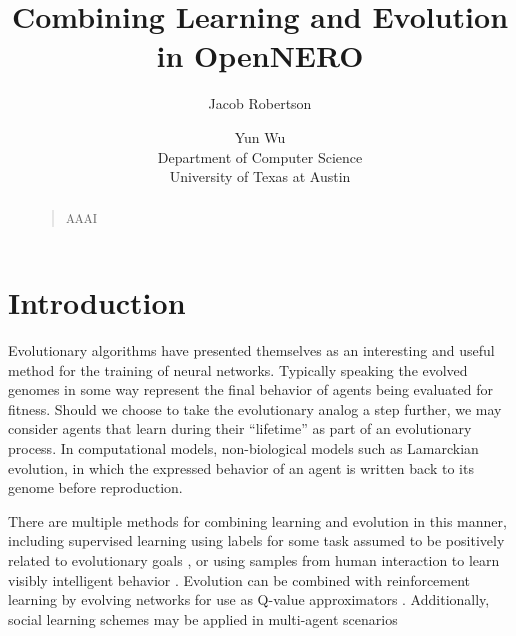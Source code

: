 \documentclass[letterpaper]{article}
\begin{document}
%
\title{Combining Learning and Evolution in OpenNERO}
\author{Jacob Robertson \and Yun Wu\\
Department of Computer Science\\
University of Texas at Austin\\
}
\maketitle
\begin{abstract}
\begin{quote}
AAAI
\end{quote}
\end{abstract}

\section{Introduction}
Evolutionary algorithms have presented themselves as an interesting and useful method for the training of neural networks. Typically speaking the evolved genomes in some way represent the final behavior of agents being evaluated for fitness. Should we choose to take the evolutionary analog a step further, we may consider agents that learn during their ``lifetime'' as part of an evolutionary process.  In computational models, non-biological models such as Lamarckian evolution, in which the expressed behavior of an agent is written back to its genome before reproduction.

There are multiple methods for combining learning and evolution in this manner, including supervised learning using labels for some task assumed to be positively related to evolutionary goals \cite{nolfi1994learning}, or using samples from human interaction to learn visibly intelligent behavior \cite{bryant2007acquiring}. Evolution can be combined with reinforcement learning by evolving networks for use as Q-value approximators \cite{whiteson2006evolutionary}. Additionally, social learning schemes may be applied in multi-agent scenarios \cite{tansey2012accelerating}
\end{document}

